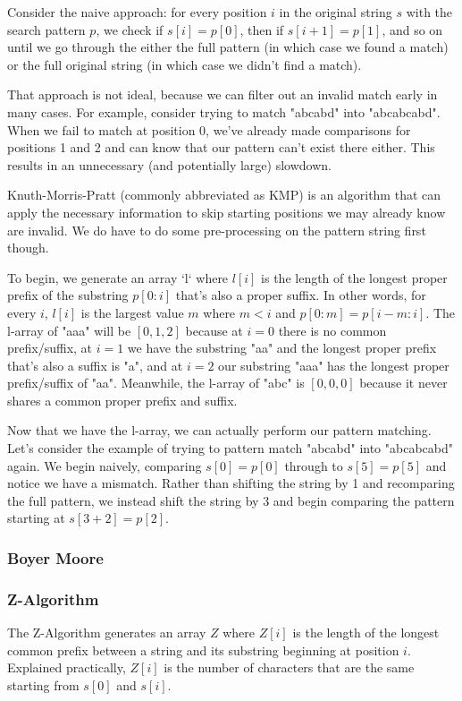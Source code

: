 Consider the naive approach: for every position $i$ in the original string $s$ with the search pattern $p$, we check if $s[i] = p[0]$, then if $s[i+1] = p[1]$, and so on until we go through the either the full pattern (in which case we found a match) or the full original string (in which case we didn't find a match).

That approach is not ideal, because we can filter out an invalid match early in many cases. For example, consider trying to match "abcabd" into "abcabcabd". When we fail to match at position 0, we've already made comparisons for positions 1 and 2 and can know that our pattern can't exist there either. This results in an unnecessary (and potentially large) slowdown.

Knuth-Morris-Pratt (commonly abbreviated as KMP) is an algorithm that can apply the necessary information to skip starting positions we may already know are invalid. We do have to do some pre-processing on the pattern string first though.

To begin, we generate an array `l` where $l[i]$ is the length of the longest proper prefix of the substring $p[0:i]$ that's also a proper suffix. In other words, for every $i$, $l[i]$ is the largest value $m$ where $m < i$ and $p[0:m] = p[i-m:i]$. The l-array of "aaa" will be $[0,1,2]$ because at $i=0$ there is no common prefix/suffix, at $i=1$ we have the substring "aa" and the longest proper prefix that's also a suffix is "a", and at $i=2$ our substring "aaa" has the longest proper prefix/suffix of "aa". Meanwhile, the l-array of "abc" is $[0,0,0]$ because it never shares a common proper prefix and suffix.

Now that we have the l-array, we can actually perform our pattern matching. Let's consider the example of trying to pattern match "abcabd" into "abcabcabd" again. We begin naively, comparing $s[0] = p[0]$ through to $s[5] = p[5]$ and notice we have a mismatch. Rather than shifting the string by 1 and recomparing the full pattern, we instead shift the string by 3 and begin comparing the pattern starting at $s[3+2] = p[2]$.

\subsubsection{Boyer Moore}
\subsubsection{Z-Algorithm}

The Z-Algorithm generates an array $Z$ where $Z[i]$ is the length of the longest common prefix between a string and its substring beginning at position $i$. Explained practically, $Z[i]$ is the number of characters that are the same starting from $s[0]$ and $s[i]$.

